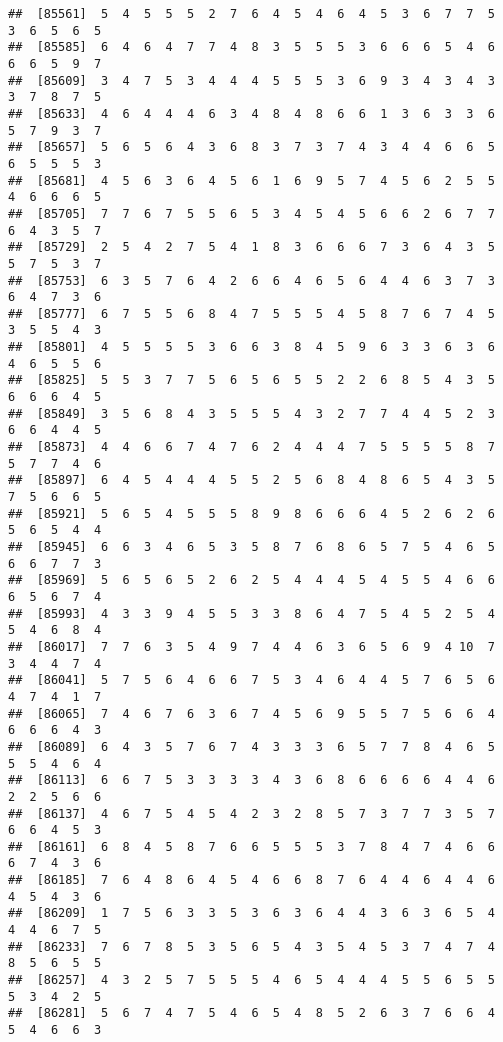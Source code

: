 \documentclass[
]{book}
\begin{document}
\begin{verbatim}
##  [85561]  5  4  5  5  5  2  7  6  4  5  4  6  4  5  3  6  7  7  5  3  6  5  6  5
##  [85585]  6  4  6  4  7  7  4  8  3  5  5  5  3  6  6  6  5  4  6  6  6  5  9  7
##  [85609]  3  4  7  5  3  4  4  4  5  5  5  3  6  9  3  4  3  4  3  3  7  8  7  5
##  [85633]  4  6  4  4  4  6  3  4  8  4  8  6  6  1  3  6  3  3  6  5  7  9  3  7
##  [85657]  5  6  5  6  4  3  6  8  3  7  3  7  4  3  4  4  6  6  5  6  5  5  5  3
##  [85681]  4  5  6  3  6  4  5  6  1  6  9  5  7  4  5  6  2  5  5  4  6  6  6  5
##  [85705]  7  7  6  7  5  5  6  5  3  4  5  4  5  6  6  2  6  7  7  6  4  3  5  7
##  [85729]  2  5  4  2  7  5  4  1  8  3  6  6  6  7  3  6  4  3  5  5  7  5  3  7
##  [85753]  6  3  5  7  6  4  2  6  6  4  6  5  6  4  4  6  3  7  3  6  4  7  3  6
##  [85777]  6  7  5  5  6  8  4  7  5  5  5  4  5  8  7  6  7  4  5  3  5  5  4  3
##  [85801]  4  5  5  5  5  3  6  6  3  8  4  5  9  6  3  3  6  3  6  4  6  5  5  6
##  [85825]  5  5  3  7  7  5  6  5  6  5  5  2  2  6  8  5  4  3  5  6  6  6  4  5
##  [85849]  3  5  6  8  4  3  5  5  5  4  3  2  7  7  4  4  5  2  3  6  6  4  4  5
##  [85873]  4  4  6  6  7  4  7  6  2  4  4  4  7  5  5  5  5  8  7  5  7  7  4  6
##  [85897]  6  4  5  4  4  4  5  5  2  5  6  8  4  8  6  5  4  3  5  7  5  6  6  5
##  [85921]  5  6  5  4  5  5  5  8  9  8  6  6  6  4  5  2  6  2  6  5  6  5  4  4
##  [85945]  6  6  3  4  6  5  3  5  8  7  6  8  6  5  7  5  4  6  5  6  6  7  7  3
##  [85969]  5  6  5  6  5  2  6  2  5  4  4  4  5  4  5  5  4  6  6  6  5  6  7  4
##  [85993]  4  3  3  9  4  5  5  3  3  8  6  4  7  5  4  5  2  5  4  5  4  6  8  4
##  [86017]  7  7  6  3  5  4  9  7  4  4  6  3  6  5  6  9  4 10  7  3  4  4  7  4
##  [86041]  5  7  5  6  4  6  6  7  5  3  4  6  4  4  5  7  6  5  6  4  7  4  1  7
##  [86065]  7  4  6  7  6  3  6  7  4  5  6  9  5  5  7  5  6  6  4  6  6  6  4  3
##  [86089]  6  4  3  5  7  6  7  4  3  3  3  6  5  7  7  8  4  6  5  5  5  4  6  4
##  [86113]  6  6  7  5  3  3  3  3  4  3  6  8  6  6  6  6  4  4  6  2  2  5  6  6
##  [86137]  4  6  7  5  4  5  4  2  3  2  8  5  7  3  7  7  3  5  7  6  6  4  5  3
##  [86161]  6  8  4  5  8  7  6  6  5  5  5  3  7  8  4  7  4  6  6  6  7  4  3  6
##  [86185]  7  6  4  8  6  4  5  4  6  6  8  7  6  4  4  6  4  4  6  4  5  4  3  6
##  [86209]  1  7  5  6  3  3  5  3  6  3  6  4  4  3  6  3  6  5  4  4  4  6  7  5
##  [86233]  7  6  7  8  5  3  5  6  5  4  3  5  4  5  3  7  4  7  4  8  5  6  5  5
##  [86257]  4  3  2  5  7  5  5  5  4  6  5  4  4  4  5  5  6  5  5  5  3  4  2  5
##  [86281]  5  6  7  4  7  5  4  6  5  4  8  5  2  6  3  7  6  6  4  5  4  6  6  3

\end{verbatim}
\end{document}
